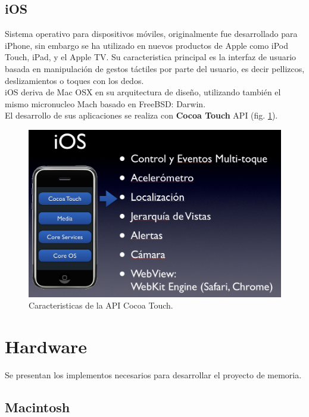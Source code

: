 		\subsection{iOS}
Sistema operativo para dispositivos móviles, originalmente fue desarrollado para iPhone, sin embargo se ha utilizado en nuevos productos de Apple como iPod Touch, iPad, y el Apple TV. Su caracteristica principal es la interfaz de usuario basada en manipulación de gestos táctiles por parte del usuario, es decir pellizcos, deslizamientos o toques con los dedos.\\

iOS deriva de Mac OSX en su arquitectura de diseño, utilizando también el mismo micronucleo Mach basado en FreeBSD: Darwin.\\

El desarrollo de sus aplicaciones se realiza con \textbf{Cocoa Touch} API (fig. \ref{fig:ios-cocoatouch}).
\begin{figure}[H]
	\centering
	\includegraphics[scale=0.35]{imgs/ios-cocoatouch.png} 
	\caption{Caracteristicas de la API Cocoa Touch.}
	\label{fig:ios-cocoatouch}
\end{figure}  




	\section{Hardware}
		Se presentan los implementos necesarios para desarrollar el proyecto de memoria.
		\subsection{Macintosh}
	

